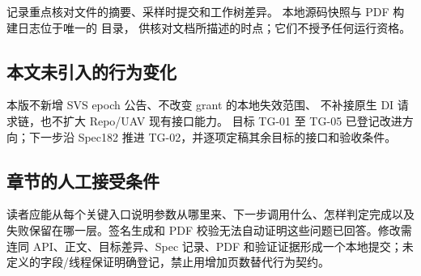  记录重点核对文件的摘要、采样时提交和工作树差异。
本地源码快照与 PDF 构建日志位于唯一的  目录，
供核对文档所描述的时点；它们不授予任何运行资格。

\subsection{本文未引入的行为变化}
本版不新增 SVS epoch 公告、不改变 grant 的本地失效范围、
不补接原生 DI 请求链，也不扩大 Repo/UAV 现有接口能力。
目标 TG-01 至 TG-05 已登记改进方向；下一步沿 Spec182 推进 TG-02，并逐项定稿其余目标的接口和验收条件。


\subsection{章节的人工接受条件}
读者应能从每个关键入口说明参数从哪里来、下一步调用什么、怎样判定完成以及失败保留在哪一层。签名生成和 PDF 校验无法自动证明这些问题已回答。修改需连同 API、正文、目标差异、Spec 记录、PDF 和验证证据形成一个本地提交；未定义的字段/线程保证明确登记，禁止用增加页数替代行为契约。
